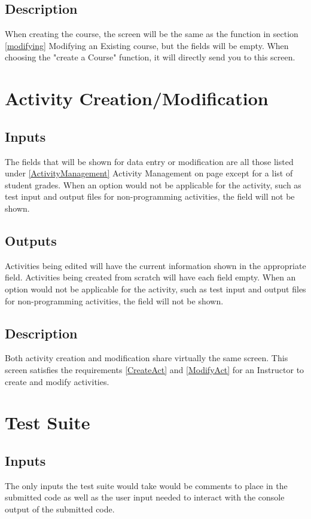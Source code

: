 \documentclass{article}
\begin{document}
\subsection{Description}
When creating the course, the screen will be the same as the function in section
\ref{modifying} Modifying an Existing course, but the fields will be empty.
When choosing the "create a Course" function, it will directly send you to this screen.

\section{Activity Creation/Modification}
\subsection{Inputs}
The fields that will be shown for data entry or modification are all those listed
under \ref{ActivityManagement} Activity Management on page
\pageref{ActivityManagement} except for a list of student grades.
When an option would not be applicable for the activity, such as test input and
output files for non-programming activities, the field will not be shown.
\subsection{Outputs}
Activities being edited will have the current information shown in the appropriate field.
Activities being created from scratch will have each field empty.
When an option would not be applicable for the activity, such as test input and
output files for non-programming activities, the field will not be shown.
\subsection{Description}
Both activity creation and modification share virtually the same screen.
This screen satisfies the requirements \ref{CreateAct} and \ref{ModifyAct} for
an Instructor to create and modify activities.

\section{Test Suite}
\subsection{Inputs}
The only inputs the test suite would take would be comments to place in the
submitted code as well as the user input needed to interact with the console
output of the submitted code.
\end{document}

